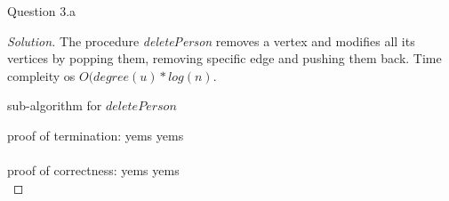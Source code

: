 \begin{solution}{Question 3.a}
\begin{proof}[Solution]
        The procedure \textit{deletePerson} removes a vertex and modifies all its vertices by popping them, removing specific edge and pushing them back. Time compleity os $O(degree(u)*log(n)$.
        \begin{algorithm}[H]
            \caption{sub-algorithm for $deletePerson$}
            \begin{algorithmic}[1]
                \EndFor
                \State{\Return{}}
                \EndProcedure{}
            \end{algorithmic}
        \end{algorithm}

        proof of termination:
        yems yems\\
        \\
        proof of correctness:
        yems yems\\
    \end{proof}
\end{solution}

